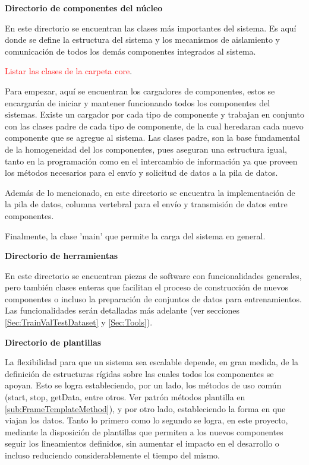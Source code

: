             \textbf{Directorio de componentes del núcleo}
            
                En este directorio se encuentran las clases más importantes del sistema. Es aquí donde se define la estructura del sistema y los mecanismos de aislamiento y comunicación de todos los demás componentes integrados al sistema. 
                
                \textcolor{red}{Listar las clases de la carpeta core}.
                
                Para empezar, aquí se encuentran los cargadores de componentes, estos se encargarán de iniciar y mantener funcionando todos los componentes del sistemas. Existe un cargador por cada tipo de componente y trabajan en conjunto con las clases padre de cada tipo de componente, de la cual heredaran cada nuevo componente que se agregue al sistema. Las clases padre, son la base fundamental de la homogeneidad del los componentes, pues aseguran una estructura igual, tanto en la programación como en el intercambio de información ya que proveen los métodos necesarios para el envío y solicitud de datos a la pila de datos.
                
                Además de lo mencionado, en este directorio se encuentra la implementación de la pila de datos, columna vertebral para el envío y transmisión de datos entre componentes.
                
                Finalmente, la clase 'main' que permite la carga del sistema en general.
            
            \textbf{Directorio de herramientas}
            
                En este directorio se encuentran piezas de software con funcionalidades generales, pero también clases enteras que facilitan el proceso de construcción de nuevos componentes o incluso la preparación de conjuntos de datos para entrenamientos. Las funcionalidades serán detalladas más adelante (ver secciones \ref{Sec:TrainValTestDataset} y \ref{Sec:Tools}).
            
            \textbf{Directorio de plantillas}
                
                La flexibilidad para que un sistema sea escalable depende, en gran medida, de la definición de estructuras rígidas sobre las cuales todos los componentes se apoyan. Esto se logra estableciendo, por un lado, los métodos de uso común (start, stop, getData, entre otros. Ver patrón métodos plantilla en \ref{sub:FrameTemplateMethod}), y por otro lado, estableciendo la forma en que viajan los datos. Tanto lo primero como lo segundo se logra, en este proyecto, mediante la disposición de plantillas que permiten a los nuevos componentes seguir los lineamientos definidos, sin aumentar el impacto en el desarrollo o incluso reduciendo considerablemente el tiempo del mismo.
                
